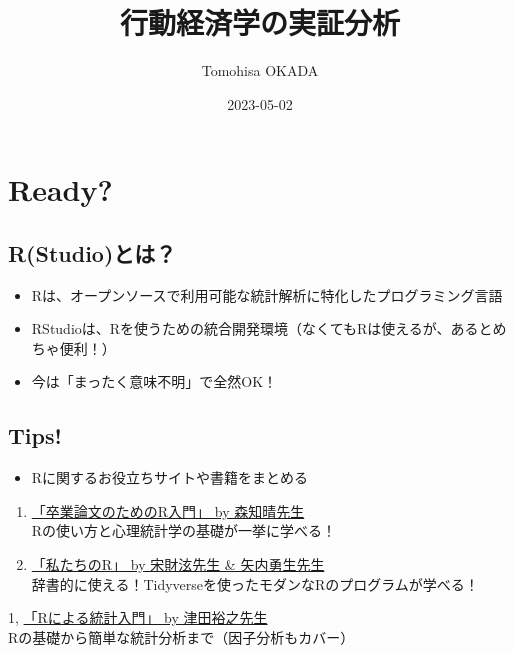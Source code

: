 \documentclass[
]{book}
\title{行動経済学の実証分析}
\author{Tomohisa OKADA}
\date{2023-05-02}
\providecommand{\tightlist}{%
  \setlength{\itemsep}{0pt}\setlength{\parskip}{0pt}}
\begin{document}
\maketitle

{
\setcounter{tocdepth}{1}
\tableofcontents
}
\hypertarget{ready}{%
\chapter{Ready?}\label{ready}}

\hypertarget{rstudioux3068ux306f}{%
\section{R(Studio)とは？}\label{rstudioux3068ux306f}}

\begin{itemize}
\tightlist
\item
  Rは、オープンソースで利用可能な統計解析に特化したプログラミング言語
\item
  RStudioは、Rを使うための統合開発環境（なくてもRは使えるが、あるとめちゃ便利！）\\
\item
  今は「まったく意味不明」で全然OK！
\end{itemize}

\hypertarget{tips}{%
\section{Tips!}\label{tips}}

\begin{itemize}
\tightlist
\item
  Rに関するお役立ちサイトや書籍をまとめる
\end{itemize}

\begin{enumerate}
\def\labelenumi{\arabic{enumi}.}
\item
  \href{https://tomoecon.github.io/R_for_graduate_thesis/}{「卒業論文のためのR入門」 by 森知晴先生}\\
  Rの使い方と心理統計学の基礎が一挙に学べる！
\item
  \href{https://www.jaysong.net/RBook/datahandling1.html}{「私たちのR」 by 宋財泫先生 \& 矢内勇生先生}\\
  辞書的に使える！Tidyverseを使ったモダンなRのプログラムが学べる！
\end{enumerate}

1, \href{https://htsuda.net/stats/}{「Rによる統計入門」 by 津田裕之先生}\\
Rの基礎から簡単な統計分析まで（因子分析もカバー）
\end{document}

